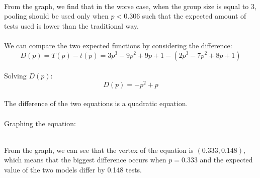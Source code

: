 \\
From the graph, we find that in the worse case, when the group size is equal to 3, pooling should be used only when $p<0.306$ such that the expected amount of tests used is lower than the traditional way.
\\
\\
We can compare the two expected functions by considering the difference:
\\
\begin{displaymath}
D(p)=T(p)-t(p)=3p^3-9p^2+9p+1-(2p^{3}-7p^{2}+8p+1)
\end{displaymath}
\\
Solving $D(p):$
\\
\begin{displaymath}
D(p)=-p^2+p
\end{displaymath}
\\
The difference of the two equations is a quadratic equation.
\\
\\
Graphing the equation:
\\
\begin{center}
\end{center}
\\
From the graph, we can see that the vertex of the equation is $(0.333,0.148)$, which means that the biggest difference occurs when $p=0.333$ and the expected value of the two models differ by 0.148 tests.